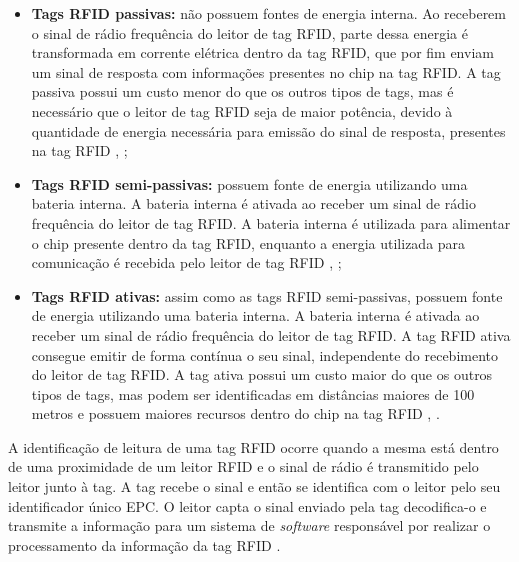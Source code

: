 \begin{itemize}
    \item \textbf{Tags \acrshort{RFID} passivas:} não possuem fontes de energia interna. Ao receberem o sinal de rádio frequência do leitor de tag \acrshort{RFID}, parte dessa energia é transformada em corrente elétrica dentro da tag \acrshort{RFID}, que por fim enviam um sinal de resposta com informações presentes no chip na tag \acrshort{RFID}. A tag passiva possui um custo menor do que os outros tipos de tags, mas é necessário que o leitor de tag \acrshort{RFID} seja de maior potência, devido à quantidade de energia necessária para emissão do sinal de resposta, presentes na tag \acrshort{RFID} \cite{Juels2006RFIDSurvey}, \cite{Bolic2010}; 
    \item \textbf{Tags \acrshort{RFID} semi-passivas:} possuem fonte de energia utilizando uma bateria interna. A bateria interna é ativada ao receber um sinal de rádio frequência do leitor de tag \acrshort{RFID}. A bateria interna é utilizada para alimentar o chip presente dentro da tag \acrshort{RFID}, enquanto a energia utilizada para comunicação é recebida pelo leitor de tag \acrshort{RFID} \cite{Bolic2010}, \cite{Juels2006RFIDSurvey};
    \item \textbf{Tags \acrshort{RFID} ativas:} assim como as tags \acrshort{RFID} semi-passivas, possuem fonte de energia utilizando uma bateria interna. A bateria interna é ativada ao receber um sinal de rádio frequência do leitor de tag \acrshort{RFID}. A tag \acrshort{RFID} ativa consegue emitir de forma contínua o seu sinal, independente do recebimento do leitor de tag \acrshort{RFID}. A tag ativa possui um custo maior do que os outros tipos de tags, mas podem ser identificadas em distâncias maiores de 100 metros e possuem maiores recursos dentro do chip na tag \acrshort{RFID} \cite{Bolic2010}, \cite{Juels2006RFIDSurvey}.
\end{itemize}


A identificação de leitura de uma tag \acrshort{RFID} ocorre quando a mesma está dentro de uma proximidade de um leitor \acrshort{RFID} e o sinal de rádio é transmitido pelo leitor junto à tag. A tag recebe o sinal e então se identifica com o leitor pelo seu identificador único \acrshort{EPC}. O leitor capta o sinal enviado pela tag decodifica-o e transmite a informação para um sistema de \textit{software} responsável por realizar o processamento da informação da tag \acrshort{RFID} \cite{Bolic2010}. 

